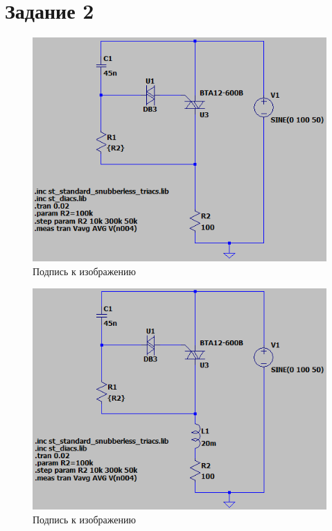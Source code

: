 \documentclass[a4paper, 12pt]{article}
\begin{document}
    \section{Задание 2}
    \begin{figure}[H]
        \centering
        \includegraphics[scale=0.5]{scheme4.png}
        \captionsetup{skip=0pt}
        \caption{Подпись к изображению}
        \label{fig:scheme4}
    \end{figure}


    \begin{figure}[H]
        \centering
        \includegraphics[scale=0.5]{scheme5.png}
        \captionsetup{skip=0pt}
        \caption{Подпись к изображению}
        \label{fig:scheme5}
    \end{figure}
\end{document}
